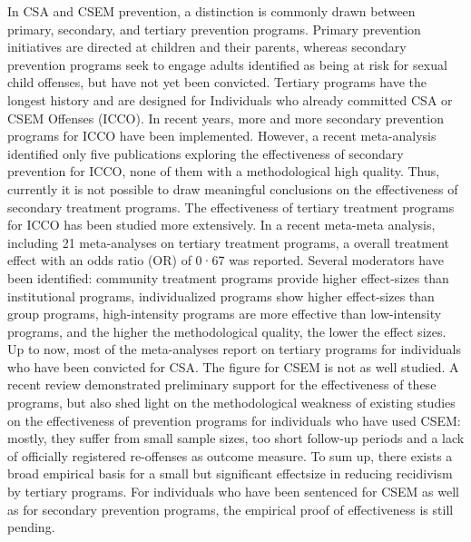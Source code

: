 \documentclass[
  super,
  preprint,
  1p,
  onecolumn]{elsarticle}
\begin{document}
In CSA and CSEM prevention, a distinction is commonly drawn between
primary, secondary, and tertiary prevention programs. Primary prevention
initiatives are directed at children and their parents, whereas
secondary prevention programs seek to engage adults identified as being
at risk for sexual child offenses, but have not yet been convicted.
Tertiary programs have the longest history and are designed for
Individuals who already committed CSA or CSEM Offenses (ICCO).
\citep{kewleyPreventingChildSexual2023} In recent years, more and more
secondary prevention programs for ICCO have been implemented.
\citep{setoEvaluatingChildSexual2024} However, a recent meta-analysis
identified only five publications exploring the effectiveness of
secondary prevention for ICCO, none of them with a methodological high
quality.
\citep{kewleyPreventingChildSexual2023, setoEvaluatingChildSexual2024}
Thus, currently it is not possible to draw meaningful conclusions on the
effectiveness of secondary treatment programs.
\citep{setoEvaluatingChildSexual2024} The effectiveness of tertiary
treatment programs for ICCO has been studied more extensively. In a
recent meta-meta analysis, including 21 meta-analyses on tertiary
treatment programs, a overall treatment effect with an odds ratio (OR)
of 0·67 was reported. \citep{olverSexualOffenseTreatment2025} Several
moderators have been identified: community treatment programs provide
higher effect-sizes than institutional programs, individualized programs
show higher effect-sizes than group programs, high-intensity programs
are more effective than low-intensity programs, and the higher the
methodological quality, the lower the effect sizes.
\citep{holperModeratorsSexualRecidivism2024, olverSexualOffenseTreatment2025}
Up to now, most of the meta-analyses report on tertiary programs for
individuals who have been convicted for CSA. The figure for CSEM is not
as well studied. A recent review demonstrated preliminary support for
the effectiveness of these programs, but also shed light on the
methodological weakness of existing studies on the effectiveness of
prevention programs for individuals who have used CSEM: mostly, they
suffer from small sample sizes, too short follow-up periods and a lack
of officially registered re-offenses as outcome measure.
\citep{gouveiaSystematicReviewEffectiveness2025} To sum up, there exists
a broad empirical basis for a small but significant effectsize in
reducing recidivism by tertiary programs. For individuals who have been
sentenced for CSEM as well as for secondary prevention programs, the
empirical proof of effectiveness is still pending.
\end{document}
